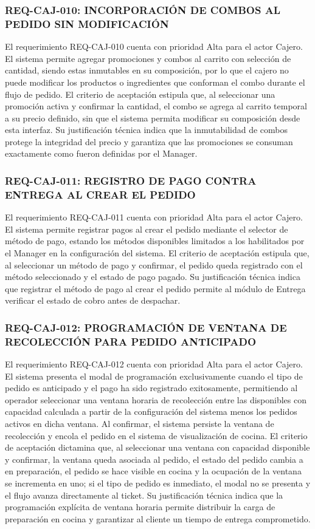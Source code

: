 \subsubsection{REQ-CAJ-010: INCORPORACIÓN DE COMBOS AL PEDIDO SIN MODIFICACIÓN}
El requerimiento REQ-CAJ-010 cuenta con prioridad Alta para el actor Cajero. El sistema permite agregar promociones y combos al carrito con selección de cantidad, siendo estas inmutables en su composición, por lo que el cajero no puede modificar los productos o ingredientes que conforman el combo durante el flujo de pedido. El criterio de aceptación estipula que, al seleccionar una promoción activa y confirmar la cantidad, el combo se agrega al carrito temporal a su precio definido, sin que el sistema permita modificar su composición desde esta interfaz. Su justificación técnica indica que la inmutabilidad de combos protege la integridad del precio y garantiza que las promociones se consuman exactamente como fueron definidas por el Manager.

\subsubsection{REQ-CAJ-011: REGISTRO DE PAGO CONTRA ENTREGA AL CREAR EL PEDIDO}
El requerimiento REQ-CAJ-011 cuenta con prioridad Alta para el actor Cajero. El sistema permite registrar pagos al crear el pedido mediante el selector de método de pago, estando los métodos disponibles limitados a los habilitados por el Manager en la configuración del sistema. El criterio de aceptación estipula que, al seleccionar un método de pago y confirmar, el pedido queda registrado con el método seleccionado y el estado de pago pagado. Su justificación técnica indica que registrar el método de pago al crear el pedido permite al módulo de Entrega verificar el estado de cobro antes de despachar. 

\subsubsection{REQ-CAJ-012: PROGRAMACIÓN DE VENTANA DE RECOLECCIÓN PARA PEDIDO ANTICIPADO}
El requerimiento REQ-CAJ-012 cuenta con prioridad Alta para el actor Cajero. El sistema presenta el modal de programación exclusivamente cuando el tipo de pedido es anticipado y el pago ha sido registrado exitosamente, permitiendo al operador seleccionar una ventana horaria de recolección entre las disponibles con capacidad calculada a partir de la configuración del sistema menos los pedidos activos en dicha ventana. Al confirmar, el sistema persiste la ventana de recolección y encola el pedido en el sistema de visualización de cocina. El criterio de aceptación dictamina que, al seleccionar una ventana con capacidad disponible y confirmar, la ventana queda asociada al pedido, el estado del pedido cambia a en preparación, el pedido se hace visible en cocina y la ocupación de la ventana se incrementa en uno; si el tipo de pedido es inmediato, el modal no se presenta y el flujo avanza directamente al ticket. Su justificación técnica indica que la programación explícita de ventana horaria permite distribuir la carga de preparación en cocina y garantizar al cliente un tiempo de entrega comprometido.


